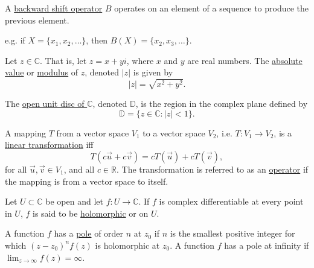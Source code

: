 \begin{defn}
A \underline{backward shift operator} $B$ operates on an element of a sequence to produce the previous element.

e.g. if $X = \{x_1, x_2, \dots\}$, then
$B(X) = \{x_2, x_3, \dots\}$.
\end{defn}

\begin{defn}
Let $z \in \mathbb{C}$.  That is, let $z = x + yi$, where $x$ and $y$ are real numbers.  The \underline{absolute value} or \underline{modulus} of $z$, denoted $|z|$ is given by \[|z| = \sqrt{x^2 + y^2}.\]
\end{defn}

\begin{defn}
The \underline{open unit disc of $\mathbb{C}$}, denoted $\mathbb{D}$, is the region in the complex plane defined by \[\mathbb{D} = \{z \in \mathbb{C} : |z| < 1\}.\]
\end{defn}

\begin{defn}
A mapping $T$ from a vector space $V_1$ to a vector space $V_2$, i.e. $T:V_1 \rightarrow V_2$, is a \underline{linear transformation} iff
\[T(c\vec{u} + c\vec{v}) = cT(\vec{u}) + cT(\vec{v}),\] for all $\vec{u}, \vec{v} \in V_1$, and all $c \in \mathbb{R}$.  The transformation is referred to as an \underline{operator} if the mapping is from a vector space to itself.
\end{defn}

\begin{defn}
Let $U \subset \mathbb{C}$ be open and let $f: U \rightarrow \mathbb{C}$.  If $f$ is complex differentiable at every point in $U$, $f$ is said to be \underline{holomorphic} or on $U$.
\end{defn}

\begin{defn}
A function $f$ has a \underline{pole} of order $n$ at $z_0$ if $n$ is the smallest positive integer for which $(z-z_0)^nf(z)$ is holomorphic at $z_0$.  A function $f$ has a pole at infinity if $\lim_{z\rightarrow \infty} f(z) = \infty$.
\end{defn}

